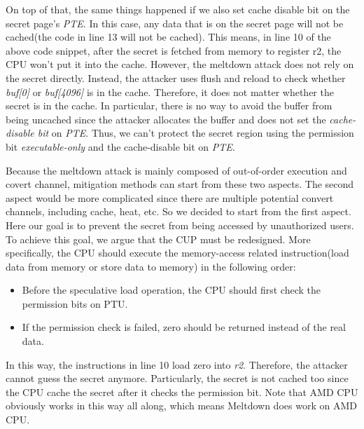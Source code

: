   On top of that, the same things happened if we also set cache disable bit 
  on the secret page's \emph{PTE}.  In this case, any data 
  that is on the secret page will not be cached(the code in line 
  13 will not be cached).  This means,  in line 10 of the above code snippet, 
  after the secret is fetched from memory to register r2, the CPU won't 
  put it into the cache.  However, the meltdown attack does not rely on the 
  secret directly.  Instead, the attacker uses flush and reload to check 
  whether \emph{buf[0]} or \emph{buf[4096]} is in the cache. Therefore, it does not 
  matter whether the secret is in the cache.  In particular, there is no 
  way to avoid the buffer from being uncached since the attacker allocates 
  the buffer and does not set the \emph{cache-disable bit} on \emph{PTE}. Thus, we can't
   protect the secret region using the permission bit \emph{executable-only}
   and the cache-disable bit on \emph{PTE}.
  


  Because the meltdown attack is mainly composed of out-of-order 
  execution and covert channel, mitigation methods can start from 
  these two aspects. The second aspect would be more complicated 
  since there are multiple potential convert channels, including 
  cache, heat, etc.  So we decided to start from the first aspect. 
  Here our goal is to prevent the secret from being accessed by 
  unauthorized users. To achieve this goal, we argue that the CUP 
  must be redesigned.  More specifically, the CPU should execute 
  the memory-access related instruction(load data from memory or 
  store data to memory) in the following order\cite{1}:


  \begin{itemize}
    \item Before the speculative load operation, the CPU should first check the permission bits on PTU. 
    \item If the permission check is failed, zero should be returned instead of the real data.
  \end{itemize}
  In this way, the instructions in line 10 load zero into \emph{r2}. 
  Therefore, the attacker cannot guess the secret anymore. Particularly, the secret is not cached too since the CPU cache the secret after 
  it checks the permission bit. Note that AMD CPU 
  obviously works in this way all along, which means Meltdown does work on AMD 
  CPU.
 \cleardoublepage

